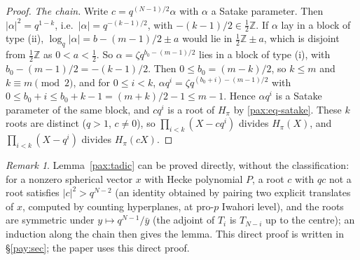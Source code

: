 \documentclass[10pt]{amsart}
\theoremstyle{definition}
\theoremstyle{remark}
\newtheorem{remark}[theorem]{Remark}
\newcommand{\Z}{\mathbb Z}
\begin{document}
\begin{proof}
\emph{The chain.} Write $c=q^{(N-1)/2}\alpha$ with $\alpha$ a Satake parameter. Then $|\alpha|^2=
q^{1-k}$, i.e.\ $|\alpha|=q^{-(k-1)/2}$, with $-(k-1)/2\in\frac12\Z$. If $\alpha$ lay in a block of
type (ii), $\log_q|\alpha|=b-(m-1)/2\pm a$ would lie in $\frac12\Z\pm a$, which is disjoint from
$\frac12\Z$ as $0<a<\frac12$. So $\alpha=\zeta q^{b_0-(m-1)/2}$ lies in a block of type (i), with
$b_0-(m-1)/2=-(k-1)/2$. Then $0\le b_0=(m-k)/2$, so $k\le m$ and $k\equiv m\pmod2$, and for $0\le i<k$,
$\alpha q^i=\zeta q^{(b_0+i)-(m-1)/2}$ with $0\le b_0+i\le b_0+k-1=(m+k)/2-1\le m-1$. Hence
$\alpha q^i$ is a Satake parameter of the same block, and $cq^i$ is a root of $H_\pi$ by
\eqref{pax:eq-satake}. These $k$ roots are distinct ($q>1$, $c\ne0$), so $\prod_{i<k}(X-cq^i)$ divides
$H_\pi(X)$, and $\prod_{i<k}(X-q^i)$ divides $H_\pi(cX)$.
\end{proof}

\begin{remark}\label{pax:rem-tadic}
Lemma~\ref{pax:tadic} can be proved directly, without the classification: for a nonzero spherical
vector $x$ with Hecke polynomial $P$, a root $c$ with $qc$ not a root satisfies $|c|^2>q^{N-2}$ (an
identity obtained by pairing two explicit translates of $x$, computed by counting hyperplanes, at
pro-$p$ Iwahori level), and the roots are symmetric under $y\mapsto q^{N-1}/\bar y$ (the adjoint of
$T_i$ is $T_{N-i}$ up to the centre); an induction along the chain then gives the lemma. This
direct proof is written in \S\ref{pay:sec}; the paper uses this direct proof.
\end{remark}
\end{document}
